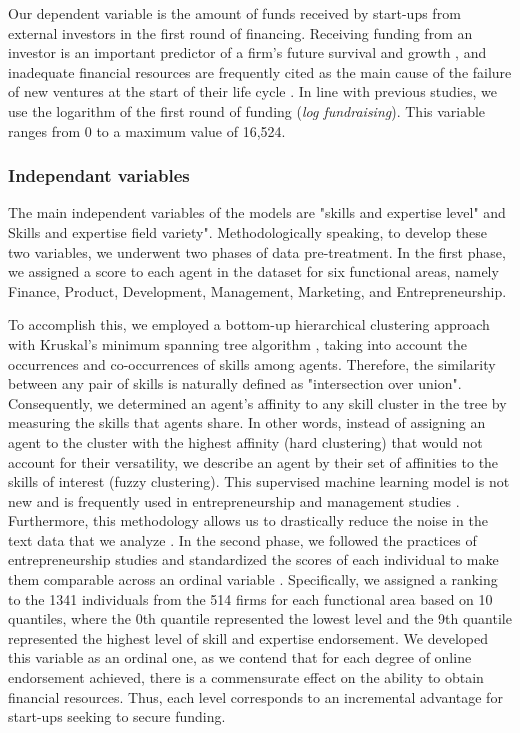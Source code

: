 \documentclass[12pt]{article}
\begin{document}
Our dependent variable is the amount of funds received by start-ups from external investors in the first round of financing. Receiving funding from an investor is an important predictor of a firm's future survival and growth \citep{beckman2007early}, and inadequate financial resources are frequently cited as the main cause of the failure of new ventures at the start of their life cycle \citep{franke2008venture, eddleston2016you}. In line with previous studies, we use the logarithm of the first round of funding (\textit{log fundraising}). This variable ranges from 0 to a maximum value of 16,524.

\subsubsection{Independant variables}

The main independent variables of the models are "skills and expertise level" and Skills and expertise field variety". Methodologically speaking, to develop these two variables, we underwent two phases of data pre-treatment. In the first phase, we assigned a score to each agent in the dataset for six functional areas, namely Finance, Product, Development, Management, Marketing, and Entrepreneurship.

To accomplish this, we employed a bottom-up hierarchical clustering approach with Kruskal's minimum spanning tree algorithm \citep{kruskal1956shortest}, taking into account the occurrences and co-occurrences of skills among agents. Therefore, the similarity between any pair of skills is naturally defined as "intersection over union". Consequently, we determined an agent's affinity to any skill cluster in the tree by measuring the skills that agents share. In other words, instead of assigning an agent to the cluster with the highest affinity (hard clustering) that would not account for their versatility, we describe an agent by their set of affinities to the skills of interest (fuzzy clustering). This supervised machine learning model is not new and is frequently used in entrepreneurship and management studies \citep{kaushal2021artificial}. Furthermore, this methodology allows us to drastically reduce the noise in the text data that we analyze \citep{wu2018analysis}. In the second phase, we followed the practices of entrepreneurship studies and standardized the scores of each individual to make them comparable across an ordinal variable \citep{harrison2007s}. Specifically, we assigned a ranking to the 1341 individuals from the 514 firms for each functional area based on 10 quantiles, where the 0th quantile represented the lowest level and the 9th quantile represented the highest level of skill and expertise endorsement. We developed this variable as an ordinal one, as we contend that for each degree of online endorsement achieved, there is a commensurate effect on the ability to obtain financial resources. Thus, each level corresponds to an incremental advantage for start-ups seeking to secure funding.
\end{document}
